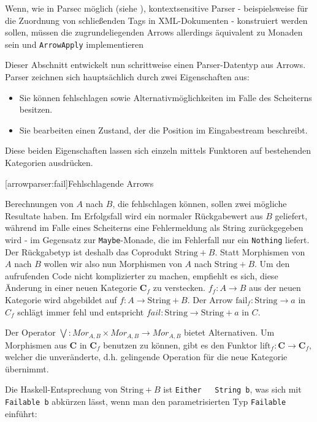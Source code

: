 \documentclass[11pt, a4paper, bibgerm]{book}
\newcommand\icode[1]{\lstinline?#1?}
\newcommand\lsection{}
\newcommand\ato{\rightarrow} %
\begin{document}
Wenn, wie in Parsec möglich (siehe \cite[S. 3]{Parsec}),
kontextsensitive Parser - beispielsweise für die Zuordnung von
schließenden Tags in XML-Dokumenten - konstruiert werden sollen,
müssen die zugrundeliegenden Arrows allerdings äquivalent zu Monaden
sein und \icode{ArrowApply} implementieren

Dieser Abschnitt entwickelt nun schrittweise einen Parser-Datentyp aus
Arrows. Parser zeichnen sich hauptsächlich durch zwei Eigenschaften aus:
\begin{itemize}
\item Sie können fehlschlagen sowie Alternativmöglichkeiten im Falle des
  Scheiterns besitzen.
\item Sie bearbeiten einen Zustand, der die Position im Eingabestream
  beschreibt.
\end{itemize}
Diese beiden Eigenschaften lassen sich einzeln mittels Funktoren auf
bestehenden Kategorien ausdrücken.

\lsection[arrowparser:fail]{Fehlschlagende Arrows}

Berechnungen von $A$ nach $B$, die fehlschlagen können, sollen zwei
mögliche Resultate haben. Im Erfolgsfall wird ein normaler Rückgabewert
aus $B$ geliefert, während im Falle eines Scheiterns eine Fehlermeldung
als String zurückgegeben wird - im Gegensatz zur \icode{Maybe}-Monade,
die im Fehlerfall nur ein \icode{Nothing} liefert. Der Rückgabetyp ist
deshalb das Coprodukt $\mathrm{String}+B$. Statt Morphismen von $A$ nach
$B$ wollen wir also nun Morphismen von $A$ nach $\mathrm{String}+B$. Um
den aufrufenden Code nicht komplizierter zu machen, empfiehlt es sich,
diese Änderung in einer neuen Kategorie $\mathbf{C}_f$ zu
verstecken. $f_{f} : A \rightarrow B$ aus der neuen Kategorie wird
abgebildet auf $f : A \rightarrow \mathrm{String} + B$. Der Arrow
$\mathrm{fail}_{f} : \mathrm{String} \rightarrow a$ in $C_{f}$ schlägt
immer fehl und entspricht $fail : \mathrm{String} \rightarrow
\mathrm{String} + a$ in $C$.

Der Operator $\bigvee : Mor_{A,B} \times Mor_{A,B}
\rightarrow Mor_{A,B} $ bietet Alternativen. Um Morphismen aus
$\mathbf{C}$ in $\mathbf{C}_f$ benutzen zu können, gibt es den Funktor
$\mathrm{lift}_f:\mathbf{C} \ato \mathbf{C}_f$, welcher die
unveränderte, d.h. gelingende Operation für die neue Kategorie
übernimmt.

Die Haskell-Entsprechung von $\mathrm{String}+B$ ist \icode{Either
  String b}, was sich mit \icode{Failable b} abkürzen lässt, wenn man
den parametrisierten Typ \icode{Failable} einführt:
\end{document}
